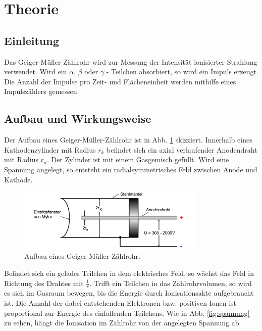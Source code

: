 \section{Theorie}
\label{sec:Theorie}

\subsection{Einleitung}
Das Geiger-Müller-Zählrohr wird zur Messung der Intensität ionisierter Strahlung verwendet.
Wird ein $\alpha$, $\beta$ oder $\gamma$ - Teilchen absorbiert, so wird ein Impuls erzeugt.
Die Anzahl der Impulse pro Zeit- und Flächeneinheit werden mithilfe eines Impulszählers gemessen.

\subsection{Aufbau und Wirkungsweise}
Der Aufbau eines Geiger-Müller-Zählrohr ist in Abb. \ref{fig:geiger} skizziert.
Innerhalb eines Kathodenzylinder mit Radius $r_k$ befindet sich ein axial verlaufender Anodendraht mit Radius $r_a$.
Der Zylinder ist mit einem Gasgemisch gefüllt.
Wird eine Spannung angelegt, so entsteht ein radialsymmetrisches Feld zwischen Anode und Kathode.
\begin{figure}
    \centering
    \includegraphics[width=0.8\textwidth]{content/data/geiger.jpg}
    \caption{Aufbau eines Geiger-Müller-Zählrohr. \cite[1]{anleitung}}
    \label{fig:geiger}
\end{figure}
Befindet sich ein gelades Teilchen in dem elektrisches Feld, so wächst das Feld in Richtung des Drahtes mit $\frac{1}{r}$.
Trifft ein Teilchen in das Zählrohrvolumen, so wird es sich im Gasraum bewegen, bis die Energie durch Ionisationsakte aufgebraucht ist.
Die Anzahl der dabei entstehenden Elektronen bzw. positiven Ionen ist proportional zur Energie des einfallenden Teilchens.
Wie in Abb. \ref{fig:spannung} zu sehen, hängt die Ionisation im Zählrohr von der angelegten Spannung ab.
